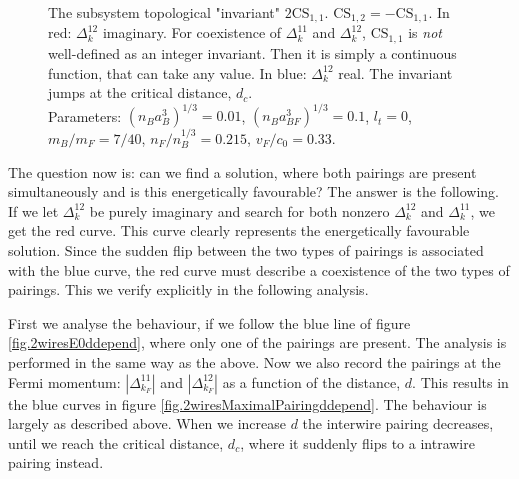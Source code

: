 \begin{figure}
\begin{center}
  
\caption{The subsystem topological "invariant" $2\text{CS}_{1,1}$. $\text{CS}_{1,2} = - \text{CS}_{1,1}$. In red: $\Delta^{12}_k$ imaginary. For coexistence of $\Delta^{11}_k$ and $\Delta^{12}_k$, $\text{CS}_{1,1}$ is \textit{not} well-defined as an integer invariant. Then it is simply a continuous function, that can take any value. In blue: $\Delta^{12}_k$ real. The invariant jumps at the critical distance, $d_c$. \\
Parameters: $(n_Ba_B^3)^{1/3} = 0.01$, $(n_Ba_{BF}^3)^{1/3} = 0.1$, $l_t = 0$, $m_B / m_F = 7/40$, $n_F / n_B^{1/3} = 0.215$, $v_F/c_0 = 0.33$. }  
\label{fig.2wiresCS11ddepend}
\end{center}    
\end{figure} 

The question now is: can we find a solution, where both pairings are present simultaneously and is this energetically favourable? The answer is the following. If we let $\Delta^{12}_k$ be purely imaginary and search for both nonzero $\Delta^{12}_k$ and $\Delta^{11}_k$, we get the red curve. This curve clearly represents the energetically favourable solution. Since the sudden flip between the two types of pairings is associated with the blue curve, the red curve must describe a coexistence of the two types of pairings. This we verify explicitly in the following analysis. 

First we analyse the behaviour, if we follow the blue line of figure \ref{fig.2wiresE0ddepend}, where only one of the pairings are present. The analysis is performed in the same way as the above. Now we also record the pairings at the Fermi momentum: $\left|\Delta^{11}_{k_F}\right|$ and $\left|\Delta^{12}_{k_F}\right|$ as a function of the distance, $d$. This results in the blue curves in figure \ref{fig.2wiresMaximalPairingddepend}. The behaviour is largely as described above. When we increase $d$ the interwire pairing decreases, until we reach the critical distance, $d_c$, where it suddenly flips to a intrawire pairing instead. 

